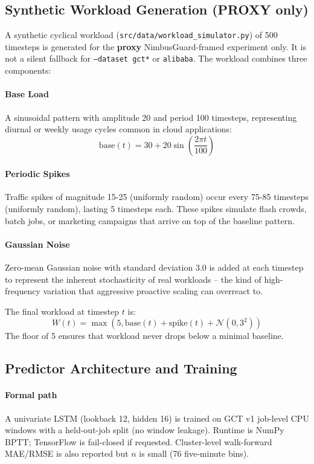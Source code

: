 \subsection{Synthetic Workload Generation (PROXY only)}


A synthetic cyclical workload (\texttt{src/data/workload\_simulator.py}) of 500 timesteps is generated for the \textbf{proxy} NimbusGuard-framed experiment only. It is not a silent fallback for \texttt{--dataset gct*} or \texttt{alibaba}. The workload combines three components:

\paragraph{Base Load} A sinusoidal pattern with amplitude 20 and period 100 timesteps, representing diurnal or weekly usage cycles common in cloud applications:
\[
\text{base}(t) = 30 + 20 \sin\left(\frac{2\pi t}{100}\right)
\]

\paragraph{Periodic Spikes} Traffic spikes of magnitude 15-25 (uniformly random) occur every 75-85 timesteps (uniformly random), lasting 5 timesteps each. These spikes simulate flash crowds, batch jobs, or marketing campaigns that arrive on top of the baseline pattern.

\paragraph{Gaussian Noise} Zero-mean Gaussian noise with standard deviation 3.0 is added at each timestep to represent the inherent stochasticity of real workloads -- the kind of high-frequency variation that aggressive proactive scaling can overreact to.

The final workload at timestep $t$ is:
\[
W(t) = \max\left(5, \text{base}(t) + \text{spike}(t) + \mathcal{N}(0, 3^2)\right)
\]
The floor of 5 ensures that workload never drops below a minimal baseline.

\subsection{Predictor Architecture and Training}

\paragraph{Formal path} A univariate LSTM (lookback 12, hidden 16) is trained on GCT v1 job-level CPU windows with a held-out-job split (no window leakage). Runtime is NumPy BPTT; TensorFlow is fail-closed if requested. Cluster-level walk-forward MAE/RMSE is also reported but $n$ is small (76 five-minute bins).

